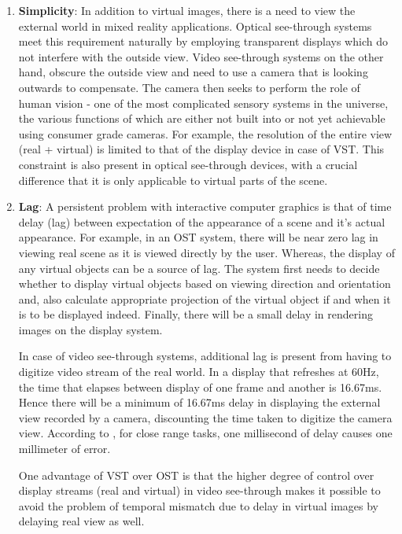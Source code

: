 \begin{enumerate}
\item \textbf{Simplicity}: In addition to virtual images, there is a need to view the external world in mixed reality applications. Optical see-through systems meet this requirement naturally by employing transparent displays which do not interfere with the outside view. Video see-through systems on the other hand, obscure the outside view and need to use a camera that is looking outwards to compensate. The camera then seeks to perform the role of human vision - one of the most complicated sensory systems in the universe, the various functions of which are either not built into or not yet achievable using consumer grade cameras. For example, the resolution of the entire view (real + virtual) is limited to that of the display device in case of VST. This constraint is also present in optical see-through devices, with a crucial difference that it is only applicable to virtual parts of the scene. 

\item \textbf{Lag}: A persistent problem with interactive computer graphics is that of time delay (lag) between expectation of the appearance of a scene and it's actual appearance. For example, in an OST system, there will be near zero lag in viewing real scene as it is viewed directly by the user. Whereas, the display of any virtual objects can be a source of lag. The system first needs to decide whether to display virtual objects based on viewing direction and orientation and, also calculate appropriate projection of the virtual object if and when it is to be displayed indeed. Finally, there will be a small delay in rendering images on the display system. 

In case of video see-through systems, additional lag is present from having to digitize video stream of the real world. In a display that refreshes at 60Hz, the time that elapses between display of one frame and another is 16.67ms. Hence there will be a minimum of 16.67ms delay in displaying the external view recorded by a camera, discounting the time taken to digitize the camera view. According to \parencite{ellis1997factors}, for close range tasks, one millisecond of delay causes one millimeter of error.

One advantage of VST over OST is that the higher degree of control over display streams (real and virtual) in video see-through makes it possible to avoid the problem of temporal mismatch due to delay in virtual images by delaying real view as well. 
 
\end{enumerate}

